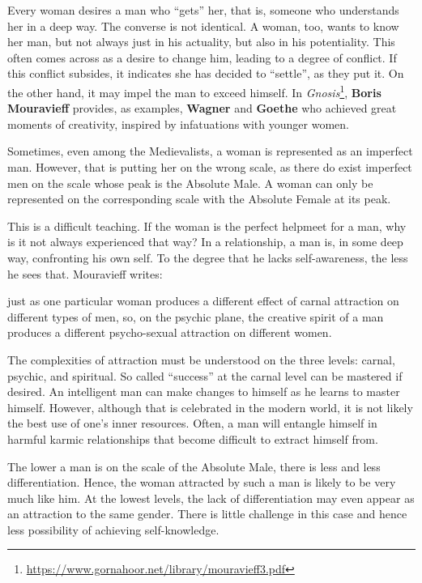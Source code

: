 Every woman desires a man who “gets” her, that is, someone who understands her in a deep way. The converse is not identical. A woman, too, wants to know her man, but not always just in his actuality, but also in his potentiality. This often comes across as a desire to change him, leading to a degree of conflict. If this conflict subsides, it indicates she has decided to “settle”, as they put it. On the other hand, it may impel the man to exceed himself. In \textit{Gnosis}\footnote{\url{https://www.gornahoor.net/library/mouravieff3.pdf}}, \textbf{Boris Mouravieff} provides, as examples, \textbf{Wagner} and \textbf{Goethe} who achieved great moments of creativity, inspired by infatuations with younger women.

Sometimes, even among the Medievalists, a woman is represented as an imperfect man. However, that is putting her on the wrong scale, as there do exist imperfect men on the scale whose peak is the Absolute Male. A woman can only be represented on the corresponding scale with the Absolute Female at its peak.

This is a difficult teaching. If the woman is the perfect helpmeet for a man, why is it not always experienced that way? In a relationship, a man is, in some deep way, confronting his own self. To the degree that he lacks self-awareness, the less he sees that. Mouravieff writes:

\begin{quotex}
just as one particular woman produces a different effect of carnal attraction on different types of men, so, on the psychic plane, the creative spirit of a man produces a different psycho-sexual attraction on different women. 

\end{quotex}
The complexities of attraction must be understood on the three levels: carnal, psychic, and spiritual. So called “success” at the carnal level can be mastered if desired. An intelligent man can make changes to himself as he learns to master himself. However, although that is celebrated in the modern world, it is not likely the best use of one's inner resources. Often, a man will entangle himself in harmful karmic relationships that become difficult to extract himself from.

The lower a man is on the scale of the Absolute Male, there is less and less differentiation. Hence, the woman attracted by such a man is likely to be very much like him. At the lowest levels, the lack of differentiation may even appear as an attraction to the same gender. There is little challenge in this case and hence less possibility of achieving self-knowledge.

